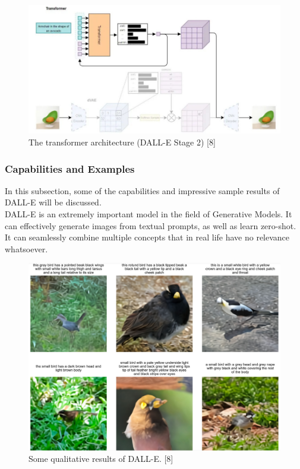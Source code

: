 \documentclass{article}
\begin{document}
\begin{figure}
    \centering
    \includegraphics[width=1\linewidth]{stage2.jpg}
    \caption{The transformer architecture (DALL-E Stage 2) [8]}
    \label{fig:enter-label}
\end{figure}

\subsubsection{Capabilities and Examples}
In this subsection, some of the capabilities and impressive sample results of DALL-E will be discussed. \\
DALL-E is an extremely important model in the field of Generative Models. It can effectively generate images from textual prompts, as well as learn zero-shot. It can seamlessly combine multiple concepts that in real life have no relevance whatsoever. 

\begin{figure} [H]
    \centering
    \includegraphics[width=1\linewidth]{dall_e_prompts.png}
    \caption{Some qualitative results of DALL-E. [8]}
    \label{fig:enter-label}
\end{figure}
\end{document}
